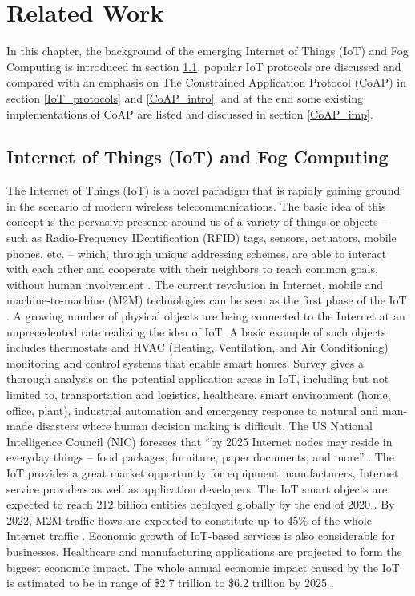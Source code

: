 \chapter{Related Work}\label{ch3}

In this chapter, the background of the emerging Internet of Things (IoT) and Fog Computing is introduced in section \ref{background}, popular IoT protocols are discussed and compared with an emphasis on The Constrained Application Protocol (CoAP) in section \ref{IoT_protocols} and \ref{CoAP_intro}, and at the end some existing implementations of CoAP are listed and discussed in section \ref{CoAP_imp}.

\section{Internet of Things (IoT) and Fog Computing} \label{background}

The Internet of Things (IoT) is a novel paradigm that is rapidly gaining ground in the scenario of modern wireless telecommunications. The basic idea of this concept is the pervasive presence around us of a variety of things or objects -- such as Radio-Frequency IDentification (RFID) tags, sensors, actuators, mobile phones, etc. -- which, through unique addressing schemes, are able to interact with each other and cooperate with their neighbors to reach common goals, without human involvement \cite{Atzori20102787}. The current revolution in Internet, mobile and machine-to-machine (M2M) technologies can be seen as the first phase of the IoT \cite{7123563}.  A growing number of physical objects are being connected to the Internet at an unprecedented rate realizing the idea of IoT. A basic example of such objects includes thermostats and HVAC (Heating, Ventilation, and Air Conditioning) monitoring and control systems that enable smart homes. Survey \cite{Atzori20102787} gives a thorough analysis on the potential application areas in IoT, including but not limited to, transportation and logistics, healthcare, smart environment (home, office, plant), industrial automation and emergency response to natural and man-made disasters where human decision making is difficult. The US National Intelligence Council (NIC) foresees that ``by 2025 Internet nodes may reside in everyday things -- food packages, furniture, paper documents, and more'' \cite{Atzori20102787}. The IoT provides a great market opportunity for equipment manufacturers, Internet service providers as well as application developers. The IoT smart objects are expected to reach 212 billion entities deployed globally by the end of 2020 \cite{gantz2012digital}. By 2022, M2M traffic flows are expected to constitute up to 45\% of the whole Internet traffic \cite{7123563}. Economic growth of IoT-based services is also considerable for businesses. Healthcare and manufacturing applications are projected to form the biggest economic impact. The whole annual economic impact caused by the IoT is estimated to be in range of \$2.7 trillion to \$6.2 trillion by 2025 \cite{7123563}.

